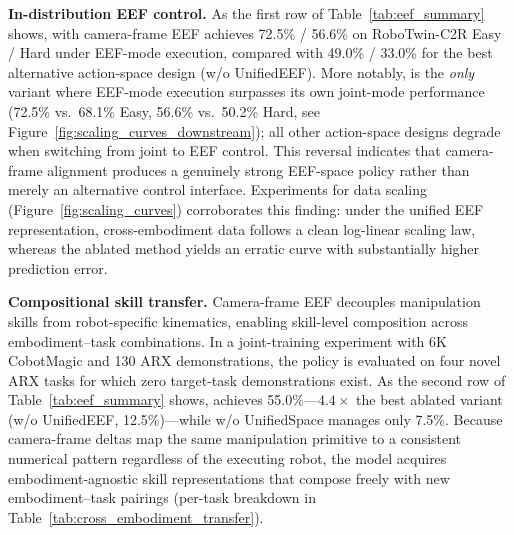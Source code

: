 \begin{table}[!t]
\centering
\caption{\textbf{Systematic advantages of camera-frame delta EEF} across three evaluation dimensions, progressing from in-distribution to zero-shot settings.}
\label{tab:eef_summary}
\small
{}
\end{table}

\textbf{In-distribution EEF control.} As the first row of Table~\ref{tab:eef_summary} shows, \ours with camera-frame EEF achieves 72.5\% / 56.6\% on RoboTwin-C2R Easy / Hard under EEF-mode execution, compared with 49.0\% / 33.0\% for the best alternative action-space design (\ours w/o UnifiedEEF). More notably, \ours is the \emph{only} variant where EEF-mode execution surpasses its own joint-mode performance (72.5\% vs.\ 68.1\% Easy, 56.6\% vs.\ 50.2\% Hard, see Figure~\ref{fig:scaling_curves_downstream}); all other action-space designs degrade when switching from joint to EEF control. This reversal indicates that camera-frame alignment produces a genuinely strong EEF-space policy rather than merely an alternative control interface. Experiments for data scaling (Figure~\ref{fig:scaling_curves}) corroborates this finding: under the unified EEF representation, cross-embodiment data follows a clean log-linear scaling law, whereas the ablated method yields an erratic curve with substantially higher prediction error.

\textbf{Compositional skill transfer.} Camera-frame EEF decouples manipulation skills from robot-specific kinematics, enabling skill-level composition across embodiment--task combinations. In a joint-training experiment with 6K CobotMagic and 130 ARX demonstrations, the policy is evaluated on four novel ARX tasks for which zero target-task demonstrations exist. As the second row of Table~\ref{tab:eef_summary} shows, \ours achieves 55.0\%---$4.4\times$ the best ablated variant (\ours w/o UnifiedEEF, 12.5\%)---while \ours w/o UnifiedSpace manages only 7.5\%. Because camera-frame deltas map the same manipulation primitive to a consistent numerical pattern regardless of the executing robot, the model acquires embodiment-agnostic skill representations that compose freely with new embodiment--task pairings (per-task breakdown in Table~\ref{tab:cross_embodiment_transfer}).

